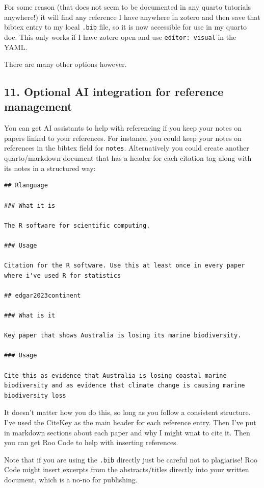 \documentclass[
  letterpaper,
  DIV=11,
  numbers=noendperiod]{scrreprt}
\begin{document}
For some reason (that does not seem to be documented in any quarto
tutorials anywhere!) it will find any reference I have anywhere in
zotero and then save that bibtex entry to my local \texttt{.bib} file,
so it is now accessible for use in my quarto doc. This only works if I
have zotero open and use \texttt{editor:\ visual} in the YAML.

There are many other options however.

\subsection{11. Optional AI integration for reference
management}\label{optional-ai-integration-for-reference-management}

You can get AI assistants to help with referencing if you keep your
notes on papers linked to your references. For instance, you could keep
your notes on references in the bibtex field for \texttt{notes}.
Alternatively you could create another quarto/markdown document that has
a header for each citation tag along with its notes in a structured way:

\begin{verbatim}
## Rlanguage 

### What it is

The R software for scientific computing. 

### Usage

Citation for the R software. Use this at least once in every paper where i've used R for statistics

## edgar2023continent

### What is it

Key paper that shows Australia is losing its marine biodiversity. 

### Usage

Cite this as evidence that Australia is losing coastal marine biodiversity and as evidence that climate change is causing marine biodiversity loss
\end{verbatim}

It doesn't matter how you do this, so long as you follow a consistent
structure. I've used the CiteKey as the main header for each reference
entry. Then I've put in markdown sections about each paper and why I
might wnat to cite it. Then you can get Roo Code to help with inserting
references.

Note that if you are using the \texttt{.bib} directly just be careful
not to plagiarise! Roo Code might insert excerpts from the
abstracts/titles directly into your written document, which is a no-no
for publishing.
\end{document}
